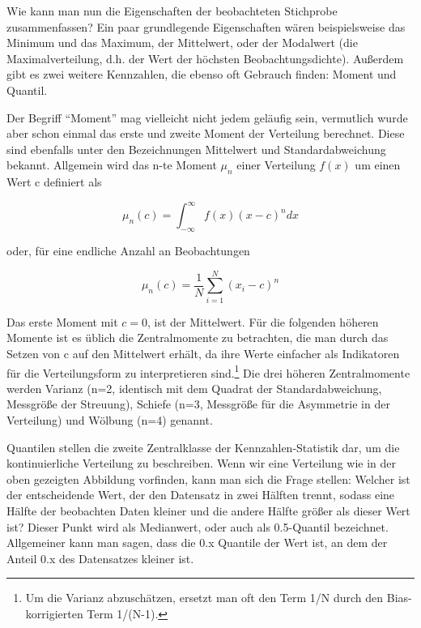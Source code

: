 \documentclass[a4paper,twoside]{tufte-book}\usepackage[]{graphicx}\usepackage[]{color}
\begin{document}
Wie kann man nun die Eigenschaften der beobachteten Stichprobe zusammenfassen? Ein paar grundlegende Eigenschaften wären beispielsweise das Minimum und das Maximum, der Mittelwert, oder der Modalwert (die Maximalverteilung, d.h. der Wert der höchsten Beobachtungsdichte). Außerdem  gibt es zwei weitere Kennzahlen, die ebenso oft Gebrauch finden: Moment und Quantil.


Der Begriff "`Moment"' mag vielleicht nicht jedem geläufig sein, vermutlich wurde aber schon einmal das erste und zweite Moment der Verteilung berechnet. Diese sind ebenfalls unter den Bezeichnungen Mittelwert und Standardabweichung bekannt. Allgemein wird das n-te Moment $\mu_n$ einer Verteilung $f(x)$ um einen Wert c definiert als 

\begin{equation}
\mu_n(c) = \int_{-\infty}^{\infty} f(x) (x - c)^n dx
\end{equation}

oder, für eine endliche Anzahl an Beobachtungen 

\begin{equation}
\mu_n(c) = \frac{1}{N}\sum_{i=1}^N (x_i - c)^n
\end{equation}

Das erste Moment mit $c=0$, ist der Mittelwert. Für die folgenden höheren Momente ist es üblich die Zentralmomente zu betrachten, die man durch das Setzen von c auf den Mittelwert erhält, da ihre Werte einfacher als Indikatoren für die Verteilungsform zu interpretieren sind.\footnote{Um die Varianz abzuschätzen, ersetzt man oft den Term 1/N durch den Bias-korrigierten Term 1/(N-1).} Die drei höheren Zentralmomente werden Varianz (n=2, identisch mit dem Quadrat der Standardabweichung, Messgröße der Streuung), Schiefe (n=3, Messgröße für die Asymmetrie in der Verteilung) und Wölbung (n=4) genannt. 

Quantilen stellen die zweite Zentralklasse der Kennzahlen-Statistik dar, um die kontinuierliche Verteilung zu beschreiben. Wenn wir eine Verteilung wie in der oben gezeigten Abbildung vorfinden, kann man sich die Frage stellen: Welcher ist der entscheidende Wert, der den Datensatz in zwei Hälften trennt, sodass eine Hälfte der beobachten Daten kleiner und die andere Hälfte größer als dieser Wert ist? Dieser Punkt wird als Medianwert, oder auch als 0.5-Quantil bezeichnet. Allgemeiner kann man sagen, dass die 0.x Quantile der Wert ist, an dem der Anteil 0.x des Datensatzes kleiner ist. 
\end{document}

